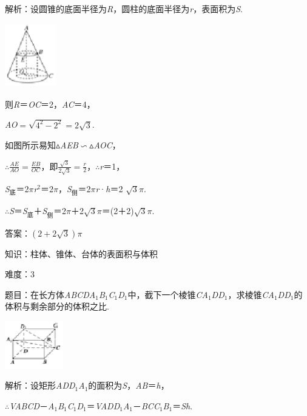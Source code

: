 \documentclass{article} %
\begin{document}
解析：设圆锥的底面半径为\textit{R}，圆柱的底面半径为\textit{r}，表面积为\textit{S}.

\includegraphics*[width=0.87in, height=1.09in, keepaspectratio=false]{image74}

则\textit{R}＝\textit{OC}＝2，\textit{AC}＝4，

\textit{AO}$=\sqrt{4^2-2^2}=2\sqrt{3}$.

如图所示易知$\mathrm{\vartriangle}$\textit{AEB}$\mathrm{\backsim}$$\mathrm{\vartriangle}$\textit{AOC}，

$\mathrm{\therefore}\frac{AE}{AO}=\frac{EB}{OC}$，即$\frac{\sqrt{3}}{2\sqrt{3}}=\frac{r}{2}$，$\mathrm{\therefore}$\textit{r}＝1，

\textit{S}${}_{\textrm{底}}$＝2$\pi$\textit{r}${}^{2}$＝2$\pi$，\textit{S}${}_{\textrm{侧}}$＝2$\pi$\textit{r}·\textit{h}＝2 $\sqrt{3}\pi$.

$\mathrm{\therefore}$\textit{S}＝\textit{S}${}_{\textrm{底}}$＋\textit{S}${}_{\textrm{侧}}$＝2$\pi$＋2$\sqrt{3}\pi$＝(2＋2)$\sqrt{3}\pi$.

答案：$(2+2\sqrt{3})\pi$

知识：柱体、锥体、台体的表面积与体积

难度：3

题目：在长方体\textit{ABCD}­\textit{A}${}_{1}$\textit{B}${}_{1}$\textit{C}${}_{1}$\textit{D}${}_{1}$中，截下一个棱锥\textit{C}­\textit{A}${}_{1}$\textit{DD}${}_{1}$，求棱锥\textit{C}­\textit{A}${}_{1}$\textit{DD}${}_{1}$的体积与剩余部分的体积之比.

\includegraphics*[width=1.00in, height=0.81in, keepaspectratio=false]{image75}

解析：设矩形\textit{ADD}${}_{1}$\textit{A}${}_{1}$的面积为\textit{S}，\textit{AB}＝\textit{h}，

$\mathrm{\therefore}$\textit{VABCD}－\textit{A}${}_{1}$\textit{B}${}_{1}$\textit{C}${}_{1}$\textit{D}${}_{1}$＝\textit{VADD}${}_{1}$\textit{A}${}_{1}$－\textit{BCC}${}_{1}$\textit{B}${}_{1}$＝\textit{Sh}.
\end{document}
